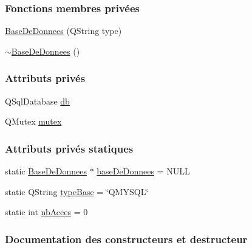 \subsubsection*{Fonctions membres privées}
\begin{DoxyCompactItemize}
\item 
\hyperlink{class_base_de_donnees_a10dd177f1008f675ab78c2221b2a6750}{Base\+De\+Donnees} (Q\+String type)
\item 
\hyperlink{class_base_de_donnees_a5dc474cdbe003644fb0ca7b8f2ec6b93}{$\sim$\+Base\+De\+Donnees} ()
\end{DoxyCompactItemize}
\subsubsection*{Attributs privés}
\begin{DoxyCompactItemize}
\item 
Q\+Sql\+Database \hyperlink{class_base_de_donnees_a3e738dcf443370c46a541677ab619f06}{db}
\item 
Q\+Mutex \hyperlink{class_base_de_donnees_aa1b4696fac87a740f914aa73739086f2}{mutex}
\end{DoxyCompactItemize}
\subsubsection*{Attributs privés statiques}
\begin{DoxyCompactItemize}
\item 
static \hyperlink{class_base_de_donnees}{Base\+De\+Donnees} $\ast$ \hyperlink{class_base_de_donnees_a822ba0b7cf85b1e48ced8efd3d65e266}{base\+De\+Donnees} = N\+U\+LL
\item 
static Q\+String \hyperlink{class_base_de_donnees_ab682b82167f494496a6531bfe522b42b}{type\+Base} = \char`\"{}Q\+M\+Y\+S\+QL\char`\"{}
\item 
static int \hyperlink{class_base_de_donnees_a5099ecb2922bb31d84cd5d4505298a29}{nb\+Acces} = 0
\end{DoxyCompactItemize}


\subsubsection{Documentation des constructeurs et destructeur}
\mbox{\label{class_base_de_donnees_a10dd177f1008f675ab78c2221b2a6750}} 

